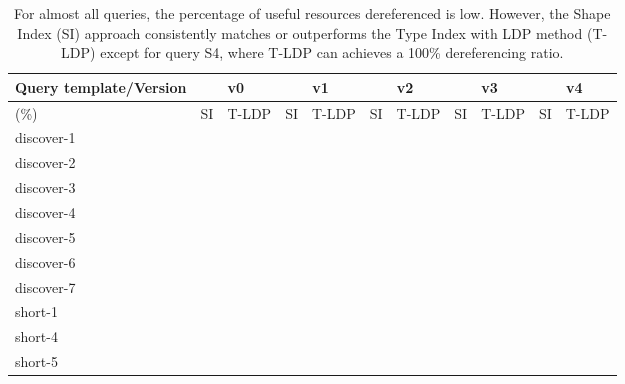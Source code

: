 \begin{table}[htbp]
	\begin{center}
		\begin{tabular}{|l|c|c|c|c|c|c|c|c|c|c|}
			\hline
            \multicolumn{1}{|c}{Query template/Version} & \multicolumn{2}{|c|}{v0} & \multicolumn{2}{|c|}{v1} & \multicolumn{2}{|c|}{v2} & \multicolumn{2}{|c|}{v3} & \multicolumn{2}{|c|}{v4} \\
			\hline
            (\%) & SI  & T-LDP & SI & T-LDP & SI & T-LDP& SI & T-LDP & SI & T-LDP \\
            \hline
			discover-1 & {} & {} & {} & {} & {} & {} & {} & {} & {} & {} \\
            \hline
            discover-2 & {} & {} & {} & {} & {} & {} & {} & {} & {} & {} \\
			\hline
            discover-3 & {} & {} & {} & {} & {} & {} & {} & {} & {} & {} \\
			\hline
            discover-4 & {} & {} & {} & {} & {} & {} & {} & {} & {} & {} \\
			\hline
            discover-5 & {} & {} & {} & {} & {} & {} & {} & {} & {} & {} \\
			\hline
            discover-6 & {} & {} & {} & {} & {} & {} & {} & {} & {} & {} \\
			\hline
            discover-7 & {} & {} & {} & {} & {} & {} & {} & {} & {} & {} \\
			\hline
            short-1 & {} & {} & {} & {} & {} & {} & {} & {} & {} & {} \\
			\hline
            short-4 & {} & {} & {} & {} & {} & {} & {} & {} & {} & {} \\
			\hline
            short-5 & {} & {} & {} & {} & {} & {} & {} & {} & {} & {} \\
			\hline
		\end{tabular}
	\end{center}
	\caption{
        For almost all queries, the percentage of useful resources dereferenced is low. 
        However, the Shape Index (SI) approach consistently matches or outperforms the Type Index with LDP method (T-LDP) except for query S4, where T-LDP can achieves a 100\% dereferencing ratio.
        }
	\label{tab:ratioUsefulResources}
\end{table}
